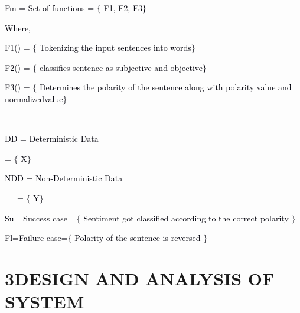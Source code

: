 \documentclass[12pt]{article}
\begin{document}
\textcolor[HTML]{00000A}{Fm = Set of functions = $ \{ $ F1, F2, F3$ \} $ }\par

\textcolor[HTML]{00000A}{Where,}\par

\textcolor[HTML]{00000A}{F1() = $ \{ $ Tokenizing the input sentences into words$ \} $ }\par

\textcolor[HTML]{00000A}{F2() = $ \{ $ classifies sentence as subjective and objective$ \} $ }\par

\textcolor[HTML]{00000A}{F3() = $ \{ $ Determines the polarity of the sentence along with polarity value and normalized\tab  value$ \} $ }\par

\textcolor[HTML]{00000A}{\ \ \ \ \ \ \ \ \ \ \ \ \ \ \ \ \ \ \ \ \ \ \ \ \ \ \ \ \ \ \ \ \ \ \ \ \ \ \ \ \ \ \ \ \ \ \ \ \ \ \ \ \ \ \ \ \ \ \ \ \ \ \ \ \  \tab }\par

\textcolor[HTML]{00000A}{DD = Deterministic Data}\par

\textcolor[HTML]{00000A}{ \tab  = $ \{ $ X$ \} $ }\par

\textcolor[HTML]{00000A}{NDD = Non-Deterministic Data}\par

\textcolor[HTML]{00000A}{ \tab \ \ \  = $ \{ $ Y$ \} $ }\par

\textcolor[HTML]{00000A}{Su= Success case =$ \{ $  Sentiment got classified according to the correct polarity $ \} $ }\par

\textcolor[HTML]{00000A}{Fl=Failure case=$ \{ $  Polarity of the sentence is reversed $ \} $ }\par

\begin{justify}
{\fontsize{15pt}{18.0pt}\selectfont \textbf{ }\par}
\end{justify}\par

\setlength{\parskip}{12.0pt}
\begin{justify}
\textbf{ }
\end{justify}\par

\section*{3\hspace*{10pt}DESIGN AND ANALYSIS OF SYSTEM}
\end{document}
